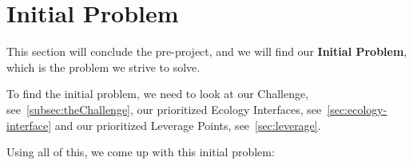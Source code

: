 \section{Initial Problem}
This section will conclude the pre-project, and we will find our \textbf{Initial Problem}, which is the problem we strive to solve.

To find the initial problem, we need to look at our Challenge, see~\autoref{subsec:theChallenge}, our prioritized Ecology Interfaces, see~\autoref{sec:ecology-interface} and our prioritized Leverage Points, see~\autoref{sec:leverage}.

Using all of this, we come up with this initial problem:

\noindent\hrulefill\par
\noindent{}


